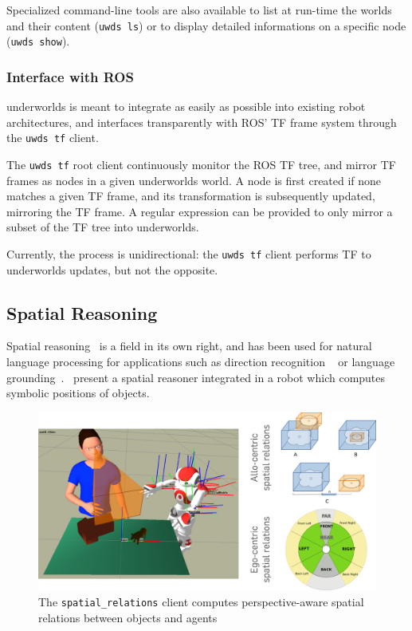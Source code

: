 \documentclass[letterpaper, 10 pt, conference]{ieeeconf}  %
\newcommand{\uwds}{{\sc underworlds}\xspace}
\begin{document}
Specialized command-line tools are also available to list at run-time the worlds
and their content ({\tt uwds ls}) or to display detailed informations on a
specific node ({\tt uwds show}).

\subsubsection{Interface with ROS}

\uwds is meant to integrate as easily as possible into existing robot
architectures, and interfaces transparently with ROS' TF frame system through
the {\tt uwds tf} client.

The {\tt uwds tf} root client continuously monitor the ROS TF tree, and mirror
TF frames as nodes in a given \uwds world. A node is first created if none
matches a given TF frame, and its transformation is subsequently updated,
mirroring the TF frame. A regular expression can be provided to only mirror a
subset of the TF tree into \uwds.

Currently, the process is unidirectional: the {\tt uwds tf} client performs TF
to \uwds updates, but not the opposite.

\subsection{Spatial Reasoning}

Spatial reasoning~\cite{O'Keefe1999} is a field in its own right, and has been
used for natural language processing for applications such as direction
recognition ~\cite{Kollar2010,Matuszek2010} or language
grounding~\cite{Tellex2010}.~\cite{Skubic2004} present a spatial reasoner
integrated in a robot which computes symbolic positions of objects.

\begin{figure}
    \centering
    \includegraphics[width=0.9\linewidth]{spatialrelations}
    \caption{The {\tt spatial\_relations} client computes perspective-aware
    spatial relations between objects and agents}
    \label{fig|spatialrelations}
\end{figure}
\end{document}
